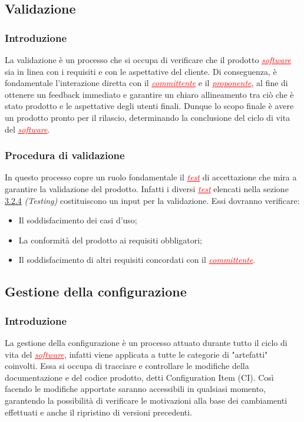 \subsection{Validazione}
\subsubsection{Introduzione}
La validazione è un processo che si occupa di verificare che il prodotto \textcolor{red}{\uline{\textit{software}}} sia in linea con i requisiti
e con le aspettative del cliente. Di conseguenza, è fondamentale l'interazione diretta con il \textcolor{red}{\uline{\textit{committente}}} e il
\textcolor{red}{\uline{\textit{proponente}}}, al fine di ottenere un feedback immediato e garantire un chiaro allineamento tra ciò che è stato
prodotto e le aspettative degli utenti finali. Dunque lo scopo finale è avere un prodotto pronto per il rilascio, determinando la 
conclusione del ciclo di vita del \textcolor{red}{\uline{\textit{software}}}.

\subsubsection{Procedura di validazione}
In questo processo copre un ruolo fondamentale il \textcolor{red}{\uline{\textit{test}}} di accettazione che mira a garantire la validazione
del prodotto. Infatti i diversi \textcolor{red}{\uline{\textit{test}}} elencati nella sezione \href{#testing}{3.2.4} \textit{(Testing)} costituiscono un input
per la validazione. Essi dovranno verificare:
\begin{itemize}
    \item Il soddisfacimento dei casi d'uso;
    \item La conformità del prodotto ai requisiti obbligatori;
    \item Il soddisfacimento di altri requisiti concordati con il \textcolor{red}{\uline{\textit{committente}}}.
\end{itemize}

\subsection{Gestione della configurazione}
\subsubsection{Introduzione}
La gestione della configurazione è un processo attuato durante tutto il ciclo di vita del \textcolor{red}{\uline{\textit{software}}}, infatti viene
applicata a tutte le categorie di "artefatti" coinvolti. Essa si occupa di tracciare e controllare le modifiche della documentazione e del codice
prodotto, detti Configuration Item (CI). Così facendo le modifiche apportate saranno accessibili in qualsiasi momento, garantendo la
possibilità di verificare le motivazioni alla base dei cambiamenti effettuati e anche il ripristino di versioni precedenti.


